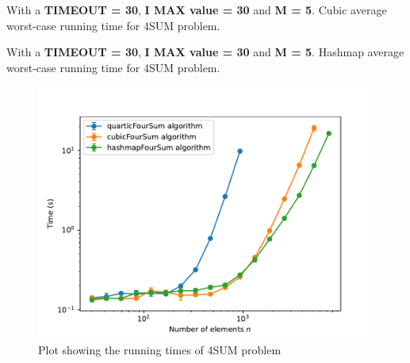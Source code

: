 \documentclass[12pt, a4paper]{article}
\begin{document}
\begin{table}[h]
  \begin{center}
  \caption{With a \textbf{TIMEOUT = 30}, \textbf{I MAX value = 30} and \textbf{M = 5}. 
  Cubic average worst-case running time for 4SUM problem.}
  \label{tbl:foursum_cubic}
  
  \end{center}
\end{table}

\begin{table}[h]
  \begin{center}
  \caption{With a \textbf{TIMEOUT = 30}, \textbf{I MAX value = 30} and \textbf{M = 5}. 
  Hashmap average worst-case running time for 4SUM problem.}
  \label{tbl:foursum_hashmap}
  
  \end{center}
\end{table}

\begin{figure}[h]
  \begin{center}
    \includegraphics[width=\textwidth]{Plot_foursum.pdf}
    \caption{Plot showing the running times of 4SUM problem}
    \label{fig:plot3sum}
  \end{center}
\end{figure}

\clearpage
\end{document}
